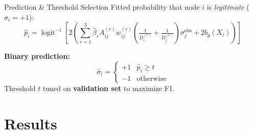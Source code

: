 \documentclass[10pt]{beamer}
\begin{document}
\begin{frame}{Prediction \& Threshold Selection}
  Fitted probability that node $i$ is \emph{legitimate} ($\sigma_i = +1$):
  \[
    \hat p_i
    = \operatorname{logit}^{-1}\left[2\left(\sum_{r=1}^3 \hat\beta_r A_{ij}^{(r)} w_{ij}^{(r)}\left(\tfrac{1}{D_i^{(r)}}+\tfrac{1}{D_j^{(r)}}\right)\sigma_j^{\text{obs}} + 2b_{\hat\theta}(X_i)\right)\right]
  \]

  \textbf{Binary prediction:}
      \[
        \hat\sigma_i = \begin{cases} +1 & \hat{p}_i \ge t \\ -1 & \text{otherwise} \end{cases}
      \]
      Threshold $t$ tuned on \textbf{validation set} to maximize F1.
\end{frame}

\section{Results}
\end{document}
